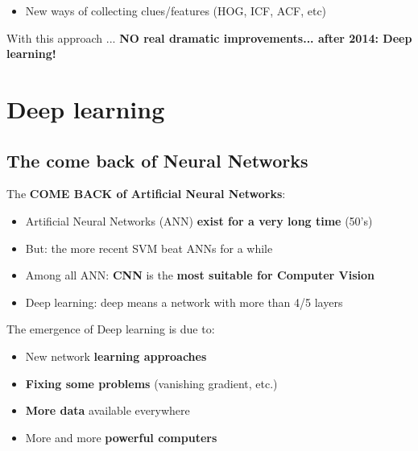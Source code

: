 \documentclass{beamer}[10pt, usepdftitle=false, handout]
\begin{document}
\begin{frame}
\begin{itemize}
{\begin{columns}
\begin{column}{0.5\textwidth}
\begin{center}
     \end{center}
	\end{column}
	\end{columns}
	
	}
	\item{New ways of collecting clues/features (HOG, ICF, ACF, etc)}
	\vspace*{1em}
	
	\end{itemize}	
	
	\begin{block}{With this approach ...}
	\textbf{NO real dramatic improvements... after 2014: Deep learning!} 
	\end{block}	
	
	\end{frame}  
    	
    \section{Deep learning}    

	\subsection{The come back of Neural Networks}    
    \begin{frame}
	
	The \textbf{COME BACK of Artificial Neural Networks}:
	\vspace*{1em}
	
	\begin{itemize}
		\item{Artificial Neural Networks (ANN) \textbf{exist for a very long time} (50's)}	
		\item{But: the more recent SVM beat ANNs for a while}
		\item{Among all ANN: \textbf{CNN} is the \textbf{most suitable for Computer Vision}}
		\item{Deep learning: deep means a network with more than 4/5 layers}
	\end{itemize}		
	\vspace*{1em}	
	
	The emergence of Deep learning is due to: 
	\vspace*{1em}

	\begin{itemize}
	\item{New network \textbf{learning approaches}}	
	\item{\textbf{Fixing some problems} (vanishing gradient, etc.)}
	\item{\textbf{More data} available everywhere}
	\item{More and more \textbf{powerful computers}}
	\end{itemize}
		

    \end{frame}    
    
\end{document}
